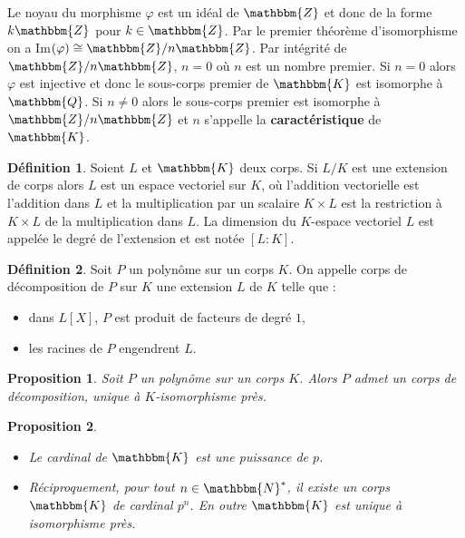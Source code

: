 \documentclass[12pt]{article}
\newcommand{\N}{\mathbbm{N}}
\newcommand{\Z}{\mathbbm{Z}}
\newcommand{\Q}{\mathbbm{Q}}
\newcommand{\K}{\mathbbm{K}}
\newtheorem{prop}{Proposition}
\theoremstyle{definition}
\newtheorem{definition}{Définition}
\begin{document}
\vspace{12pt}
Le noyau du morphisme $\varphi$ est un idéal de $\Z$ et donc de la forme $k\Z$ pour $k \in \Z$. Par le premier théorème d'isomorphisme on a Im$(\varphi) \cong \Z / n \Z$. Par intégrité de $\Z / n \Z$, $n=0$ où $n$ est un nombre premier. Si $n=0$ alors $\varphi$ est injective et donc le sous-corps premier de $\K$ est isomorphe à $\Q$. Si $n \neq 0$ alors le sous-corps premier est isomorphe à $\Z / n \Z$ et $n$ s'appelle la \textbf{caractéristique} de $\K$. 
\\

\begin{definition}
Soient $L$ et $\K$ deux corps. Si $L/K$ est une extension de corps alors $L$ est un espace vectoriel sur $K$, où l'addition vectorielle est l'addition dans $L$ et la multiplication par un scalaire $K \times L$ est la restriction à $K \times L$ de la multiplication dans $L$. La dimension du $K$-espace vectoriel $L$ est appelée le degré de l'extension et est notée $[L:K]$.
\end{definition}
\vspace{12pt}
\begin{definition}
Soit $P$ un polynôme sur un corps $K$. On appelle corps de décomposition de $P$ sur $K$ une extension $L$ de $K$ telle que :
\begin{itemize}
\item dans $L[X]$, $P$ est produit de facteurs de degré $1$,
\item les racines de $P$ engendrent $L$.
\end{itemize}
\end{definition}
\vspace{12pt}
\begin{prop}
Soit $P$ un polynôme sur un corps $K$. Alors $P$ admet un corps de décomposition, unique à $K$-isomorphisme près.
\end{prop}
\vspace{30pt}
\begin{prop}\hspace{12pt}
\begin{itemize}
\item Le cardinal de $\K$ est une puissance de $p$.
\item Réciproquement, pour tout $n \in \N^{*}$, il existe un corps $\K$ de cardinal $p^n$. En outre $\K$ est unique à isomorphisme près.
\end{itemize}
\end{prop}
\end{document}
